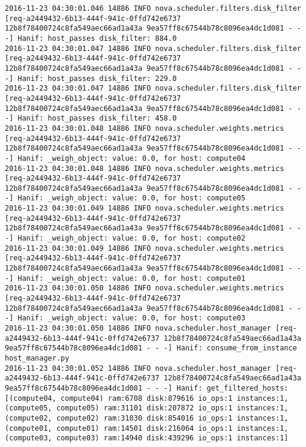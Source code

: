 \begin{lstlisting}[frame=single, caption={The filter scheduler log trace for 10 virtual instances}, label={lst:filterschedulercodetracelog10vi}, escapechar=|]
2016-11-23 04:30:01.046 14886 INFO nova.scheduler.filters.disk_filter [req-a2449432-6b13-444f-941c-0ffd742e6737 12b8f78400724c8fa549aec66ad1a43a 9ea57ff8c67544b78c8096ea4dc1d081 - - -] Hanif: host_passes disk_filter: 884.0
2016-11-23 04:30:01.047 14886 INFO nova.scheduler.filters.disk_filter [req-a2449432-6b13-444f-941c-0ffd742e6737 12b8f78400724c8fa549aec66ad1a43a 9ea57ff8c67544b78c8096ea4dc1d081 - - -] Hanif: host_passes disk_filter: 229.0
2016-11-23 04:30:01.047 14886 INFO nova.scheduler.filters.disk_filter [req-a2449432-6b13-444f-941c-0ffd742e6737 12b8f78400724c8fa549aec66ad1a43a 9ea57ff8c67544b78c8096ea4dc1d081 - - -] Hanif: host_passes disk_filter: 458.0
2016-11-23 04:30:01.048 14886 INFO nova.scheduler.weights.metrics [req-a2449432-6b13-444f-941c-0ffd742e6737 12b8f78400724c8fa549aec66ad1a43a 9ea57ff8c67544b78c8096ea4dc1d081 - - -] Hanif: _weigh_object: value: 0.0, for host: compute04
2016-11-23 04:30:01.048 14886 INFO nova.scheduler.weights.metrics [req-a2449432-6b13-444f-941c-0ffd742e6737 12b8f78400724c8fa549aec66ad1a43a 9ea57ff8c67544b78c8096ea4dc1d081 - - -] Hanif: _weigh_object: value: 0.0, for host: compute05
2016-11-23 04:30:01.049 14886 INFO nova.scheduler.weights.metrics [req-a2449432-6b13-444f-941c-0ffd742e6737 12b8f78400724c8fa549aec66ad1a43a 9ea57ff8c67544b78c8096ea4dc1d081 - - -] Hanif: _weigh_object: value: 0.0, for host: compute02
2016-11-23 04:30:01.049 14886 INFO nova.scheduler.weights.metrics [req-a2449432-6b13-444f-941c-0ffd742e6737 12b8f78400724c8fa549aec66ad1a43a 9ea57ff8c67544b78c8096ea4dc1d081 - - -] Hanif: _weigh_object: value: 0.0, for host: compute01
2016-11-23 04:30:01.050 14886 INFO nova.scheduler.weights.metrics [req-a2449432-6b13-444f-941c-0ffd742e6737 12b8f78400724c8fa549aec66ad1a43a 9ea57ff8c67544b78c8096ea4dc1d081 - - -] Hanif: _weigh_object: value: 0.0, for host: compute03
2016-11-23 04:30:01.050 14886 INFO nova.scheduler.host_manager [req-a2449432-6b13-444f-941c-0ffd742e6737 12b8f78400724c8fa549aec66ad1a43a 9ea57ff8c67544b78c8096ea4dc1d081 - - -] Hanif: consume_from_instance host_manager.py
2016-11-23 04:30:01.052 14886 INFO nova.scheduler.host_manager [req-a2449432-6b13-444f-941c-0ffd742e6737 12b8f78400724c8fa549aec66ad1a43a 9ea57ff8c67544b78c8096ea4dc1d081 - - -] Hanif: get_filtered_hosts: [(compute04, compute04) ram:6708 disk:879616 io_ops:1 instances:1, (compute05, compute05) ram:31101 disk:207872 io_ops:1 instances:1, (compute02, compute02) ram:31030 disk:854016 io_ops:1 instances:1, (compute01, compute01) ram:14501 disk:216064 io_ops:1 instances:1, (compute03, compute03) ram:14940 disk:439296 io_ops:1 instances:1]

\end{lstlisting}
